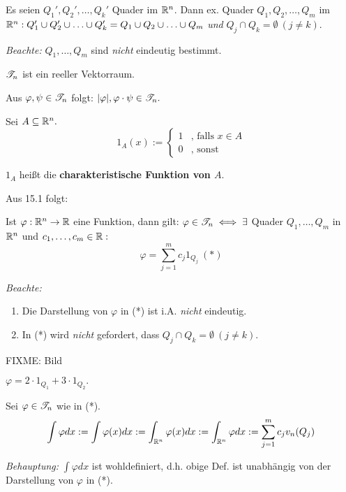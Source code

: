\documentclass{article}
\begin{document}
\begin{satz}
\begin{liste}
\item Es seien $Q_1',Q_2',\ldots,Q_k'$ Quader im $\mathbb{R}^n$. Dann ex. Quader $Q_1,Q_2,\ldots,Q_m$ im $\mathbb{R}^n: Q_1'\cup Q_2'\cup\ldots\cup Q_k' = Q_1\cup Q_2\cup\ldots\cup Q_m$ \emph{und} $Q_j\cap Q_k = \emptyset\ (j\ne k).$

\emph{Beachte:} $Q_1,\ldots,Q_m$ sind \emph{nicht} eindeutig bestimmt.

\item $\mathscr{T}_n$ ist ein reeller Vektorraum.

\item Aus $\varphi,\psi \in\mathscr{T}_n$ folgt: $|\varphi|,\varphi\cdot\psi\in\mathscr{T}_n.$
\end{liste}
\end{satz}

\begin{definition}
Sei $A\subseteq\mathbb{R}^n.$
$$1_A(x):=\begin{cases}
1 & \text{, falls }x\in A\\
0 & \text{, sonst}
\end{cases}$$

$1_A$ heißt die \textbf{charakteristische Funktion von $A$}.
\end{definition}

Aus 15.1 folgt:

Ist $\varphi:\mathbb{R}^n\to\mathbb{R}$ eine Funktion, dann gilt: $\varphi\in\mathscr{T}_n \iff \exists$ Quader $Q_1,\ldots,Q_m$ in $\mathbb{R}^n$ und $c_1,\ldots,c_m\in\mathbb{R}:$
$$\varphi=\sum_{j=1}^m c_j1_{Q_j}\ (*)$$

\emph{Beachte:} \begin{enumerate}
\item Die Darstellung von $\varphi$ in (*) ist i.A. \emph{nicht} eindeutig.
\item In (*) wird \emph{nicht} gefordert, dass $Q_j\cap Q_k=\emptyset\ (j\ne k).$
\end{enumerate}

\begin{beispiel}
FIXME: Bild

$\varphi = 2\cdot1_{Q_1} + 3\cdot1_{Q_2}.$
\end{beispiel}

\begin{satz}
Sei $\varphi\in\mathscr{T}_n$ wie in (*). $$\int \varphi dx:=\int\varphi(x)dx:=\int_{\mathbb{R}^n}\varphi(x)dx:=\int_{\mathbb{R}^n}\varphi dx:=\sum_{j=1}^mc_jv_n(Q_j)$$

\emph{Behauptung:} $\int\varphi dx$ ist wohldefiniert, d.h. obige Def. ist unabhängig von der Darstellung von $\varphi$ in (*).
\end{satz}
\end{document}
